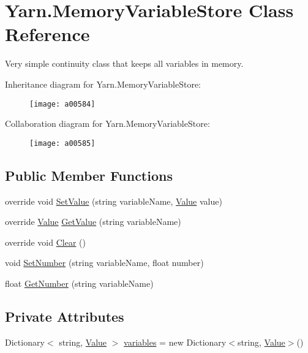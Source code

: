 \hypertarget{a00128}{\section{Yarn.\-Memory\-Variable\-Store Class Reference}
\label{a00128}
}


Very simple continuity class that keeps all variables in memory.  




Inheritance diagram for Yarn.\-Memory\-Variable\-Store\-:
\nopagebreak
\begin{figure}[H]
\begin{center}
\leavevmode
\texttt{[image: a00584]}
\end{center}
\end{figure}


Collaboration diagram for Yarn.\-Memory\-Variable\-Store\-:
\nopagebreak
\begin{figure}[H]
\begin{center}
\leavevmode
\texttt{[image: a00585]}
\end{center}
\end{figure}
\subsection*{Public Member Functions}
\begin{DoxyCompactItemize}
\item 
override void \hyperlink{a00128_a653a459811e5c19549f4b31269093ef5}{Set\-Value} (string variable\-Name, \hyperlink{a00165}{Value} value)
\item 
override \hyperlink{a00165}{Value} \hyperlink{a00128_a0ce77e8245c504a777540e359704aa2a}{Get\-Value} (string variable\-Name)
\item 
override void \hyperlink{a00128_aa6d243e7ef02b91f793a221f509dae69}{Clear} ()
\item 
void \hyperlink{a00041_a48b93de9cd7ae61d0cd9583c8330d3ee}{Set\-Number} (string variable\-Name, float number)
\item 
float \hyperlink{a00041_a1b7f7f4468b2463e7b47986d99362279}{Get\-Number} (string variable\-Name)
\end{DoxyCompactItemize}
\subsection*{Private Attributes}
\begin{DoxyCompactItemize}
\item 
Dictionary$<$ string, \hyperlink{a00165}{Value} $>$ \hyperlink{a00128_aad18acd95297edb8ed496857337f8071}{variables} = new Dictionary$<$string, \hyperlink{a00165}{Value}$>$()
\end{DoxyCompactItemize}


